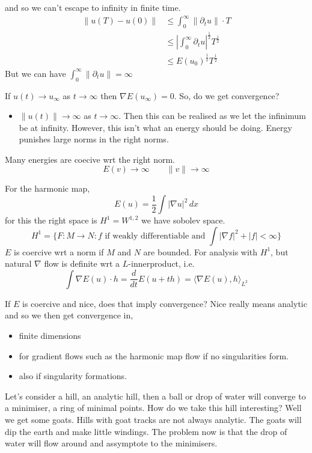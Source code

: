 \documentclass{article}
\begin{document}
and so we can't escape to infinity in finite time.
\begin{align*}
  \|u(T) - u(0)\| &\le \int_0^\infty \|\partial_t u\| \cdot T\\
  &\le \left| \int_0^\infty \partial_t u \right|^{\frac{1}{2}}T^{\frac{1}{2}}\\
  &\le E(u_0)^{\frac{1}{2}}T^{\frac{1}{2}}
\end{align*}
But we can have $\int_0^\infty \|\partial_t u\|= \infty$

If $u(t) \to u_\infty$ as $t \to \infty$ then $\nabla E(u_\infty) = 0$. So, do we get convergence?
\begin{itemize}
  \item $\|u(t)\| \to \infty$ as $t \to \infty$. Then this can be realised as we let the infinimum be at infinity. However, this isn't what an energy should be doing. Energy punishes large norms in the right norms.
\end{itemize}

Many energies are coecive wrt the right norm.
$$ E(v) \to \infty \qquad \|v\|\to\infty $$
\begin{eg}
  For the harmonic map,
  $$ E(u) = \frac{1}{2}\int |\nabla u|^2\,dx $$
  for this the right space is $H^1 = W^{1, 2}$ we have sobolev space.
  $$ H^1 = \{F : M \to N : f \text{ if weakly differentiable and } \int|\nabla f|^2 +|f| < \infty\} $$
  $E$ is coercive wrt a norm if $M$ and $N$ are bounded. For analysis with $H^1$, but natural $\nabla$ flow is definite wrt a $L$-innerproduct, i.e.
  $$ \int \nabla E(u) \cdot h = \frac{d}{dt}E(u + th) = \langle \nabla E(u) , h \rangle_{L^2}$$
\end{eg}

If $E$ is coercive and nice, does that imply convergence? Nice really means analytic and so we then get convergence in,
\begin{itemize}
  \item finite dimensions
  \item for gradient flows such as the harmonic map flow if no singularities form.
  \item also if singularity formations.
\end{itemize}

Let's consider a hill, an analytic hill, then a ball or drop of water will converge to a minimiser, a ring of minimal points. How do we take this hill interesting? Well we get some goats. Hills with goat tracks are not always analytic. The goats will dip the earth and make little windings. The problem now is that the drop of water will flow around and assymptote to the minimisers.
\end{document}
